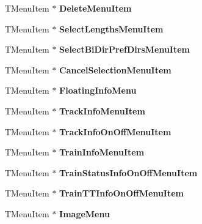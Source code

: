 \begin{DoxyCompactItemize}
T\+Menu\+Item $\ast$ {\bfseries Delete\+Menu\+Item}
\item 
\mbox{\label{class_t_interface_a605c84f7a0ab307cf5a16a4ab2dd89a5}} 
T\+Menu\+Item $\ast$ {\bfseries Select\+Lengths\+Menu\+Item}
\item 
\mbox{\label{class_t_interface_a1ac4134f6658c7f6de09ef354c0ccac8}} 
T\+Menu\+Item $\ast$ {\bfseries Select\+Bi\+Dir\+Pref\+Dirs\+Menu\+Item}
\item 
\mbox{\label{class_t_interface_adfbb51de41895e146c88bb433fde97ba}} 
T\+Menu\+Item $\ast$ {\bfseries Cancel\+Selection\+Menu\+Item}
\item 
\mbox{\label{class_t_interface_a57d5981fe7fe4db9507c583c3e23b438}} 
T\+Menu\+Item $\ast$ {\bfseries Floating\+Info\+Menu}
\item 
\mbox{\label{class_t_interface_a0804441af6dc023b354d44db8c522355}} 
T\+Menu\+Item $\ast$ {\bfseries Track\+Info\+Menu\+Item}
\item 
\mbox{\label{class_t_interface_a488b2a94eab5b7230ed5d1051a16dc50}} 
T\+Menu\+Item $\ast$ {\bfseries Track\+Info\+On\+Off\+Menu\+Item}
\item 
\mbox{\label{class_t_interface_a0dad638d76e7d41275684714e362cf43}} 
T\+Menu\+Item $\ast$ {\bfseries Train\+Info\+Menu\+Item}
\item 
\mbox{\label{class_t_interface_a3741de0fd2f1f04f5e87a207d9d1b78a}} 
T\+Menu\+Item $\ast$ {\bfseries Train\+Status\+Info\+On\+Off\+Menu\+Item}
\item 
\mbox{\label{class_t_interface_a233d28374dbeb6b15dccb6a2dee424b9}} 
T\+Menu\+Item $\ast$ {\bfseries Train\+T\+T\+Info\+On\+Off\+Menu\+Item}
\item 
\mbox{\label{class_t_interface_a9b19287e66aae03a6673d5442950c32a}} 
T\+Menu\+Item $\ast$ {\bfseries Image\+Menu}
\item 
\mbox{\label{class_t_interface_a2b553b68656ac9d2398bf796cad8bace}} 

\end{DoxyCompactItemize}
